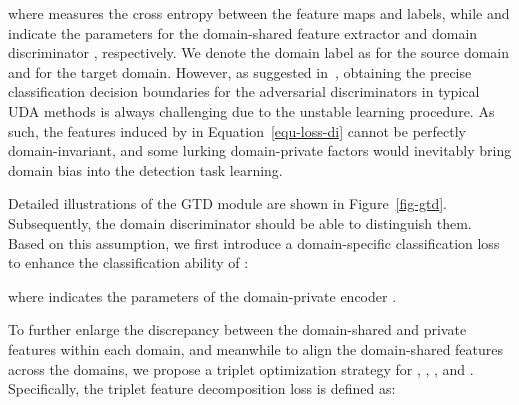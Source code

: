 \documentclass[journal]{IEEEtran}
\begin{document}
where  measures the cross entropy between the feature maps and labels, while  and  indicate the parameters for the domain-shared feature extractor  and domain discriminator , respectively. We denote the domain label as  for the source domain and  for the target domain. However, as suggested in~\cite{arjovsky2017wasserstein,cai2019learning}, obtaining the precise classification decision boundaries for the adversarial discriminators in typical UDA methods is always challenging due to the unstable learning procedure. As such, the features induced by  in Equation~\ref{equ-loss-di} cannot be perfectly domain-invariant, and some lurking domain-private factors would inevitably bring domain bias into the detection task learning. {}


{} Detailed illustrations of the GTD module are shown in Figure~\ref{fig-gtd}. {\color{black}{We consider that under the ideal situation, the domain-private  and  contain the specific factors for the source and target domains, respectively.}} Subsequently, the domain discriminator  should be able to distinguish them. Based on this assumption, we first introduce a domain-specific classification loss  to enhance the classification ability of :

where  indicates the parameters of the domain-private encoder .


To further enlarge the discrepancy between the domain-shared and private features within each domain, and meanwhile to align the domain-shared features across the domains, we propose a triplet optimization strategy for , , , and . Specifically, the triplet feature decomposition loss  is defined as:
\end{document}

